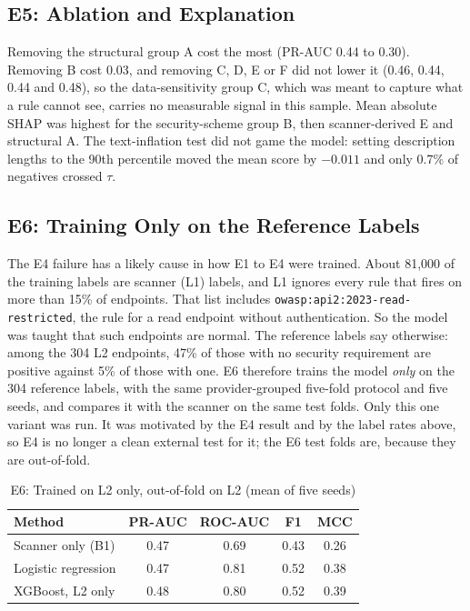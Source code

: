 \documentclass[conference]{IEEEtran}
\begin{document}
\subsection{E5: Ablation and Explanation}
Removing the structural group A cost the most (PR-AUC 0.44 to 0.30). Removing B cost 0.03, and removing C, D, E or F did not lower it (0.46, 0.44, 0.44 and 0.48), so the data-sensitivity group C, which was meant to capture what a rule cannot see, carries no measurable signal in this sample.
Mean absolute SHAP was highest for the security-scheme group B, then scanner-derived E and structural A.
The text-inflation test did not game the model: setting description lengths to the 90th percentile moved
the mean score by $-0.011$ and only 0.7\% of negatives crossed $\tau$.

\subsection{E6: Training Only on the Reference Labels}
\label{sec:e6}
The E4 failure has a likely cause in how E1 to E4 were trained. About 81{,}000 of the training labels are scanner (L1) labels,
and L1 ignores every rule that fires on more than 15\% of endpoints. That list includes \texttt{owasp:api2:2023-read-restricted},
the rule for a read endpoint without authentication. So the model was taught that such endpoints are normal. The reference labels
say otherwise: among the 304 L2 endpoints, 47\% of those with no security requirement are positive against 5\% of those with one.
E6 therefore trains the model \emph{only} on the 304 reference labels, with the same provider-grouped five-fold protocol and five seeds,
and compares it with the scanner on the same test folds. Only this one variant was run. It was motivated by the E4 result and by the
label rates above, so E4 is no longer a clean external test for it; the E6 test folds are, because they are out-of-fold.

\begin{table}[!t]
\caption{E6: Trained on L2 only, out-of-fold on L2 (mean of five seeds)}
\label{tab:e6}
\centering
\footnotesize
\begin{tabular}{lcccc}
\toprule
\textbf{Method} & \textbf{PR-AUC} & \textbf{ROC-AUC} & \textbf{F1} & \textbf{MCC}\\
\midrule
Scanner only (B1) & 0.47 & 0.69 & 0.43 & 0.26\\
Logistic regression & 0.47 & 0.81 & 0.52 & 0.38\\
XGBoost, L2 only & 0.48 & 0.80 & 0.52 & 0.39\\
\bottomrule
\end{tabular}
\end{table}
\end{document}
